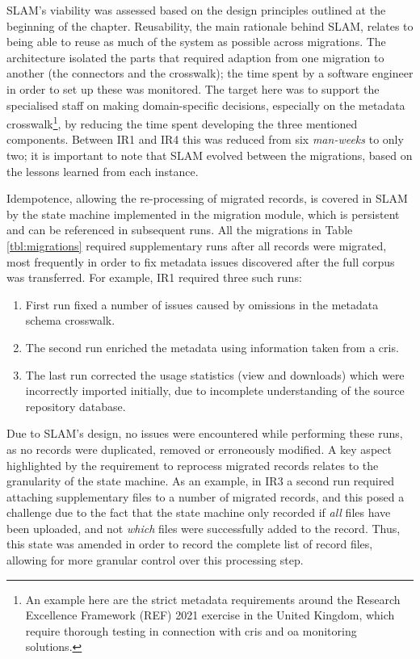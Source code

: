 SLAM's viability was assessed based on the design principles outlined at the beginning of the chapter. Reusability, the main rationale behind SLAM, relates to being able to reuse as much of the system as possible across migrations. The architecture isolated the parts that required adaption from one migration to another (the connectors and the crosswalk); the time spent by a software engineer in order to set up these was monitored. The target here was to support the specialised staff on making domain-specific decisions, especially on the metadata crosswalk\footnote{An example here are the strict metadata requirements around the Research Excellence Framework (REF) 2021 exercise in the United Kingdom, which require thorough testing in connection with \gls{cris} and \gls{oa} monitoring solutions.}, by reducing the time spent developing the three mentioned components. Between IR1 and IR4 this was reduced from six \emph{man-weeks} to only two; it is important to note that SLAM evolved between the migrations, based on the lessons learned from each instance. 
    
Idempotence, allowing the re-processing of migrated records, is covered in SLAM by the state machine implemented in the migration module, which is persistent and can be referenced in subsequent runs. All the migrations in Table \ref{tbl:migrations} required supplementary runs after all records were migrated, most frequently in order to fix metadata issues discovered after the full corpus was transferred. For example, IR1 required three such runs:
\begin{enumerate}
    \item First run fixed a number of issues caused by omissions in the metadata schema crosswalk.
    \item The second run enriched the metadata using information taken from a \gls{cris}.
    \item The last run corrected the usage statistics (view and downloads) which were incorrectly imported initially, due to incomplete understanding of the source repository database.
\end{enumerate}
Due to SLAM's design, no issues were encountered while performing these runs, as no records were duplicated, removed or erroneously modified. A key aspect highlighted by the requirement to reprocess migrated records relates to the granularity of the state machine. As an example, in IR3 a second run required attaching supplementary files to a number of migrated records, and this posed a challenge due to the fact that the state machine only recorded if \emph{all} files have been uploaded, and not \emph{which} files were successfully added to the record. Thus, this state was amended in order to record the complete list of record files, allowing for more granular control over this processing step. 
    
